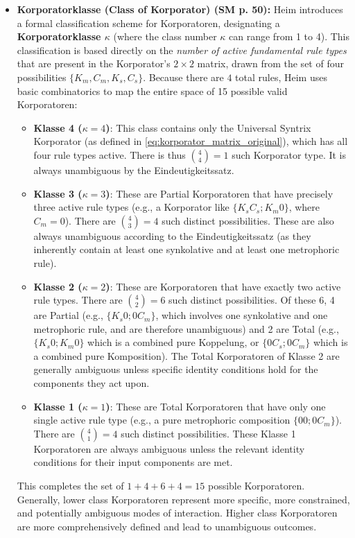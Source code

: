 \documentclass[12pt]{article}
\begin{document}
\begin{itemize}
    \item \textbf{Korporatorklasse (Class of Korporator) (SM p. 50):}
    Heim introduces a formal classification scheme for Korporatoren, designating a \textbf{Korporatorklasse \( \kappa \)} (where the class number \( \kappa \) can range from 1 to 4). This classification is based directly on the \textit{number of active fundamental rule types} that are present in the Korporator's \( 2 \times 2 \) matrix, drawn from the set of four possibilities \( \{K_m, C_m, K_s, C_s\} \). Because there are \(4\) total rules, Heim uses basic combinatorics to map the entire space of 15 possible valid Korporatoren:
    \begin{itemize}
        \item \textbf{Klasse 4 (\( \kappa=4 \))}: This class contains only the Universal Syntrix Korporator (as defined in \eqref{eq:korporator_matrix_original}), which has all four rule types active. There is thus \( \binom{4}{4} = 1 \) such Korporator type. It is always unambiguous by the Eindeutigkeitssatz.
        \item \textbf{Klasse 3 (\( \kappa=3 \))}: These are Partial Korporatoren that have precisely three active rule types (e.g., a Korporator like \( \{K_s C_s; K_m 0\} \), where \(C_m=0\)). There are \( \binom{4}{3} = 4 \) such distinct possibilities. These are also always unambiguous according to the Eindeutigkeitssatz (as they inherently contain at least one synkolative and at least one metrophoric rule).
        \item \textbf{Klasse 2 (\( \kappa=2 \))}: These are Korporatoren that have exactly two active rule types. There are \( \binom{4}{2} = 6 \) such distinct possibilities. Of these 6, 4 are Partial (e.g., \( \{K_s 0; 0 C_m\}\), which involves one synkolative and one metrophoric rule, and are therefore unambiguous) and 2 are Total (e.g., \( \{K_s 0; K_m 0\} \) which is a combined pure Koppelung, or \( \{0 C_s; 0 C_m\} \) which is a combined pure Komposition). The Total Korporatoren of Klasse 2 are generally ambiguous unless specific identity conditions hold for the components they act upon.
        \item \textbf{Klasse 1 (\( \kappa=1 \))}: These are Total Korporatoren that have only one single active rule type (e.g., a pure metrophoric composition \( \{0 0; 0 C_m\} \)). There are \( \binom{4}{1} = 4 \) such distinct possibilities. These Klasse 1 Korporatoren are always ambiguous unless the relevant identity conditions for their input components are met.
    \end{itemize}
    This completes the set of \(1 + 4 + 6 + 4 = 15\) possible Korporatoren. Generally, lower class Korporatoren represent more specific, more constrained, and potentially ambiguous modes of interaction. Higher class Korporatoren are more comprehensively defined and lead to unambiguous outcomes.


\end{itemize}
\end{document}
